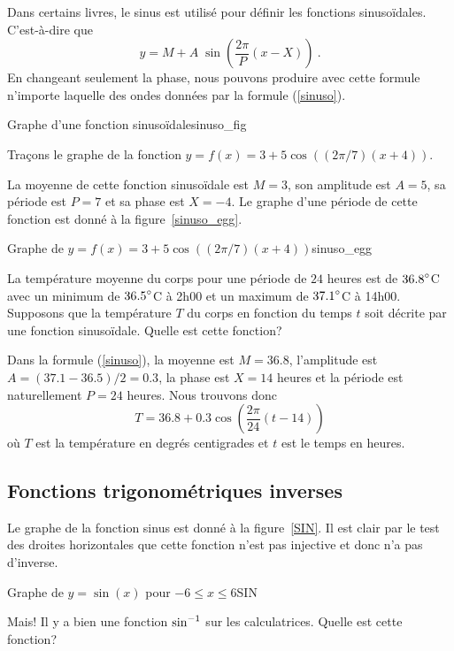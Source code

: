 {Dans certains livres, le sinus est utilisé pour définir les fonctions
sinusoïdales.  C'est-à-dire que
\[
y = M + A\;\sin\left(\frac{2\pi}{P}\left(x-X\right)\right) \ .
\]
En changeant seulement la phase, nous pouvons produire avec cette
formule n'importe laquelle des ondes données par la formule
(\ref{sinuso}).

{Graphe d'une fonction sinusoïdale}{sinuso_fig}

\begin{egg}
Traçons le graphe de la fonction $y=f(x) = 3+5 \cos((2\pi/7)(x+4))$.

La moyenne de cette fonction sinusoïdale est $M=3$, son amplitude est
$A=5$, sa période est $P=7$ et sa phase est $X=-4$.  Le graphe d'une
période de cette fonction est donné à la figure~\ref{sinuso_egg}.
\end{egg}

{Graphe de $y=f(x) = 3+5 \cos((2\pi/7)(x+4))$}{sinuso_egg}

\begin{egg}
La température moyenne du corps pour une période de $24$
heures est de $\displaystyle 36.8^\circ$C avec un minimum de $\displaystyle 36.5^\circ$C à 2h00 et
un maximum de $\displaystyle 37.1^\circ$C à 14h00.  Supposons que la
température $T$ du corps en fonction du temps $t$ soit décrite par
une fonction sinusoïdale.   Quelle est cette fonction?

Dans la formule (\ref{sinuso}), la moyenne est $M=36.8$, l'amplitude
est $A=(37.1-36.5)/2 = 0.3$, la phase est $X=14$ heures et la période
est naturellement $P=24$ heures.  Nous trouvons donc
\[
T = 36.8 + 0.3 \cos\left(\frac{2\pi}{24}(t-14)\right)
\]
où $T$ est la température en degrés centigrades et $t$ est le temps en
heures.
\end{egg}

\subsection{Fonctions trigonométriques inverses}

Le graphe de la fonction sinus est donné à la figure~\ref{SIN}.  Il
est clair par le test des droites horizontales que cette fonction
n'est pas injective et donc n'a pas d'inverse.

{Graphe de $y=\sin(x)$ pour $-6 \leq x \leq 6$}{SIN}

Mais! Il y a bien une fonction $\displaystyle \sin^{-1}$ sur les calculatrices.
Quelle est cette fonction?

}
